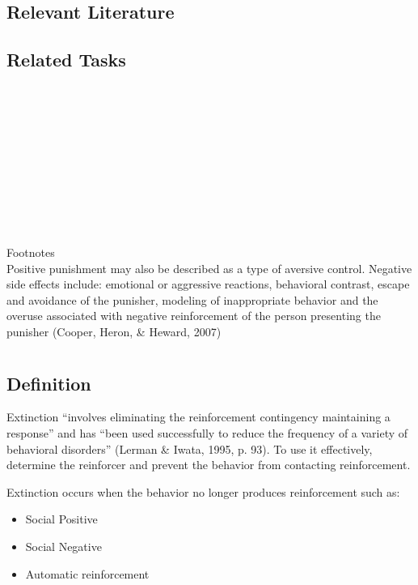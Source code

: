 \subsection{Relevant Literature}
\begin{refsection}
\nocite{bailey2013ethics,
        bac2014professional,
        cooper2007applied,
        foxx1982decreasing,
        van1988right,
        lerman2002status,
        iwata1988development}
\printbibliography[heading=none]
\end{refsection} 
%
\subsection{Related Tasks}
\fourdSixteen{}\\
\fourdFifteen{}\\
\fourdNineteen{}\\
\foureEleven{}\\
\fourgSeven{}\\
\fourjTen{}\\
\fourFKNineteen{}\\
\fourFKTwenty{}\\
\fourFKTwentyOne{}\\
\fourFKThirtyEight{}\\
%
Footnotes\\
Positive punishment may also be described as a type of aversive control. Negative side effects include: emotional or aggressive reactions, behavioral contrast, escape and avoidance of the punisher, modeling of inappropriate behavior and the overuse associated with negative reinforcement of the person presenting the punisher (Cooper, Heron, \& Heward, 2007)
%
%
%
%
%
%
%
%
%
%
%
%
%
%
%
%
%
\section{\fourdEighteen{}}
\subsection{Definition}
Extinction ``involves eliminating the reinforcement contingency maintaining a response'' and has ``been used successfully to reduce the frequency of a variety of behavioral disorders'' (Lerman \& Iwata, 1995, p. 93). To use it effectively, determine the reinforcer and prevent the behavior from contacting reinforcement. 

Extinction occurs when the behavior no longer produces reinforcement such as:
\begin{itemize}
\item Social Positive
\item Social Negative
\item Automatic reinforcement 
\end{itemize}

